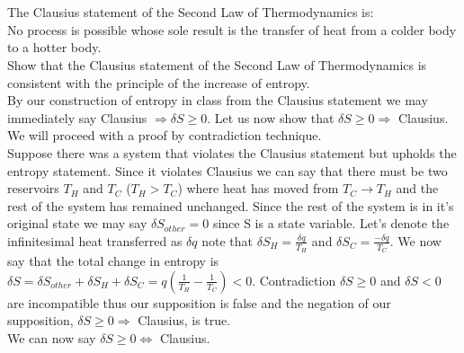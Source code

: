 \documentclass[10pt,a4paper]{article}
\begin{document}
\section{}
The Clausius statement of the Second Law of Thermodynamics is:\\
No process is possible whose sole result is the transfer of heat from a colder body to a hotter body.\\
Show that the Clausius statement of the Second Law of Thermodynamics is consistent with the principle of the increase of entropy.\\
By our construction of entropy in class from the Clausius statement we may immediately say Clausius $\Rightarrow \delta S\geq 0$.  Let us now show that $\delta S\geq 0\Rightarrow$ Clausius.\\
We will proceed with a proof by contradiction technique.\\
Suppose there was a system that violates the Clausius statement but upholds the entropy statement.  Since it violates Clausius we can say that there must be two reservoirs $T_H$ and $T_C$ ($T_H>T_C$) where heat has moved from $T_C \rightarrow T_H$ and the rest of the system has remained unchanged.  Since the rest of the system is in it's original state we may say $\delta S_{other}=0$ since S is a state variable.  Let's denote the infinitesimal heat transferred as $\delta q$ note that $\delta S_H = \frac{\delta q}{T_H}$ and $\delta S_C = \frac{-\delta q}{T_C}$.  We now say that the total change in entropy is $\delta S=\delta S_{other}+\delta S_H+\delta S_C=q(\frac{1}{T_H}-\frac{1}{T_C})<0$.  Contradiction $\delta S \geq 0$ and $\delta S <0$ are incompatible thus our supposition is false and the negation of our supposition, $\delta S\geq 0\Rightarrow$ Clausius, is true.\\
We can now say $\delta S\geq 0\Leftrightarrow$ Clausius.
\end{document}
